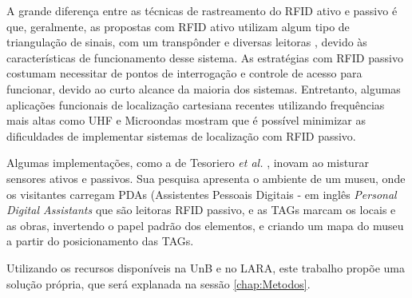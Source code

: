 A grande diferença entre as técnicas de rastreamento do RFID ativo e passivo é que, geralmente, as propostas com RFID ativo utilizam algum tipo de triangulação de sinais, com um transpônder e diversas leitoras \cite{bouet2008rfid} \cite{jin2006indoor} \cite{sanpechuda2008review}, devido às características de funcionamento desse sistema. As estratégias com RFID passivo costumam necessitar de pontos de interrogação e controle de acesso para funcionar, devido ao curto alcance da maioria dos sistemas. Entretanto, algumas aplicações funcionais de localização cartesiana recentes utilizando frequências mais altas como UHF e Microondas \cite{xarray} mostram que é possível minimizar as dificuldades de implementar sistemas de localização com RFID passivo.

Algumas implementações, como a de Tesoriero \textit{et al.} \cite{tesoriero2008using}, inovam ao misturar sensores ativos e passivos. Sua pesquisa apresenta o ambiente de um museu, onde os visitantes carregam PDAs (Assistentes Pessoais Digitais - em inglês \textit{Personal Digital Assistants} que são leitoras RFID passivo, e as TAGs marcam os locais e as obras, invertendo o papel padrão dos elementos, e criando um mapa do museu a partir do posicionamento das TAGs.

Utilizando os recursos disponíveis na UnB e no LARA, este trabalho propõe uma solução própria, que será explanada na sessão \ref{chap:Metodos}.
